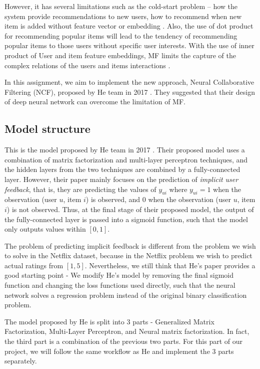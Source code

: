 \documentclass[final]{cvpr}
\begin{document}
However, it has several limitations such as the cold-start problem -- how the system provide recommendations to new users, how to recommend when new item is added without feature vector or embedding \cite{FMF}. Also, the use of dot product for recommending popular items will lead to the tendency of recommending popular items to those users without specific user interests. With the use of inner product of User and item feature embeddings, MF limits the capture of the complex relations  of the users and items interactions \cite{he2017neural}.

In this assignment, we aim to implement the new approach, Neural Collaborative Filtering (NCF), proposed by He team in 2017 \cite{he2017neural}. They suggested that their design of deep neural network can overcome the limitation of MF.

\subsection{Model structure}

This is the model proposed by He team in 2017 \cite{he2017neural}. Their proposed model uses a combination of matrix factorization and multi-layer perceptron techniques, and the hidden layers from the two techniques are combined by a fully-connected layer. However, their paper mainly focuses on the prediction of \textit{implicit user feedback}, that is, they are predicting the values of $y_{ui}$ where $y_{ui}=1$ when the observation (user $u$, item $i$) is observed, and $0$ when the
observation (user $u$, item $i$) is not observed. Thus, at the final stage of their proposed model, the output of the fully-connected layer is passed into a sigmoid function, such that the model only outputs values within $[0, 1]$. 

The problem of predicting implicit feedback is different from the problem we wish to solve in the Netflix dataset, because in the Netflix problem we wish to predict actual ratings from $[1, 5]$.
Nevertheless, we still think that He's paper provides a good starting point - We modify He's model by removing the final sigmoid function and changing the loss functions used directly, such that the neural network solves a regression problem instead of the original binary
classification problem.

The model proposed by He is split into 3 parts - Generalized Matrix Factorization, Multi-Layer Perceptron, and Neural matrix factorization. In fact, the third part is a combination of the previous two parts. For this part of our project, we will follow the same workflow as He and implement the 3 parts separately. 
\end{document}
